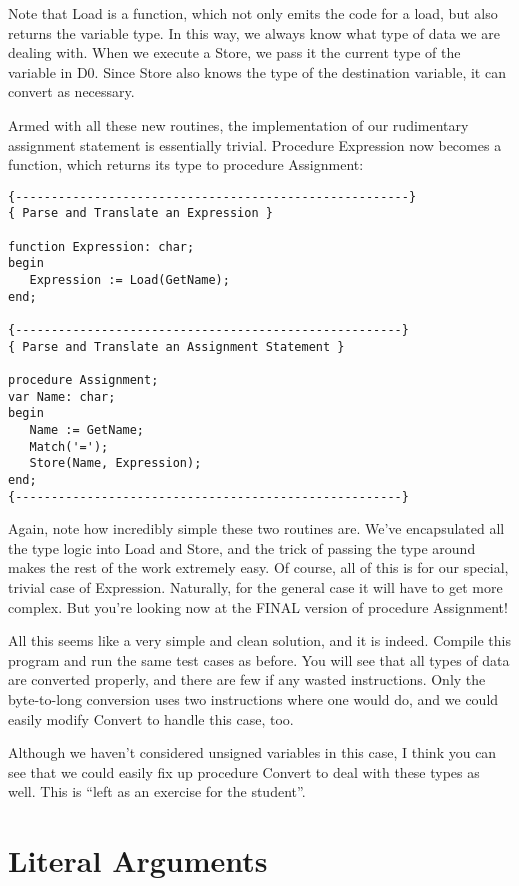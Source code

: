 Note that Load is a function, which not only emits the code for a load, but also returns the variable type. In this way, we always know what type of data we  are  dealing  with. When we execute a Store, we pass it the current type of the variable in D0. Since Store also knows the  type  of  the  destination variable, it can convert as necessary.

Armed  with all these new routines, the  implementation  of  our rudimentary   assignment   statement  is   essentially   trivial. Procedure Expression now becomes a  function, which  returns its type to procedure Assignment:

\begin{verbatim}
{-------------------------------------------------------}
{ Parse and Translate an Expression }

function Expression: char;
begin
   Expression := Load(GetName);
end;

{------------------------------------------------------}
{ Parse and Translate an Assignment Statement }

procedure Assignment;
var Name: char;
begin
   Name := GetName;
   Match('=');
   Store(Name, Expression);
end;
{------------------------------------------------------}
\end{verbatim}

Again, note how  incredibly  simple these two routines are. We've encapsulated  all the type logic into Load  and  Store, and  the trick of  passing  the  type  around  makes  the rest of the work extremely easy. Of  course, all  of  this is for our special, trivial case of Expression. Naturally, for the  general  case it will have to get more complex. But  you're  looking  now  at the FINAL version of procedure Assignment!

All this seems like a very  simple  and clean solution, and it is indeed. Compile this program and run the  same  test  cases  as before. You will see that all  types  of  data  are  converted properly, and there are few if any wasted instructions. Only the byte-to-long conversion uses two instructions where one would do, and we could easily modify Convert to handle this case, too.

Although we haven't considered unsigned variables in this case, I think you can see  that  we could easily fix up procedure Convert to deal with these types as well. This is  ``left  as an exercise for the student''.

\section{Literal Arguments}

